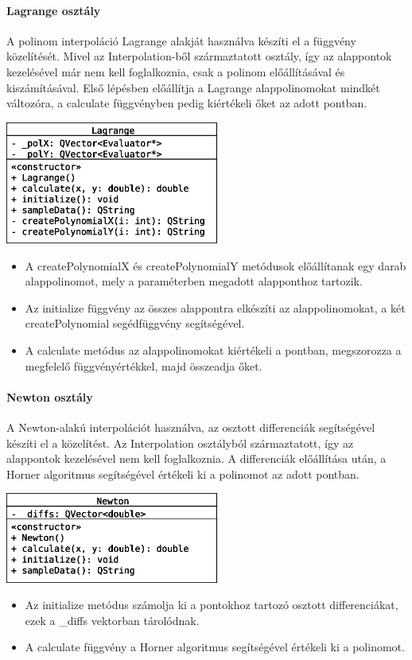\documentclass[12pt]{report}
\begin{document}
\paragraph{Lagrange osztály}
A polinom interpoláció Lagrange alakját használva készíti el a függvény közelítését. Mivel az Interpolation-ből származtatott osztály, így az alappontok kezelésével már nem kell foglalkoznia, csak a polinom előállításával és kiszámításával. Első lépésben előállítja a Lagrange alappolinomokat mindkét változóra, a calculate függvényben pedig kiértékeli őket az adott pontban.
\begin{center}
\includegraphics[width=7cm]{pics/uml/Lagrange}
\end{center}
\begin{itemize}
\item A createPolynomialX és createPolynomialY metódusok előállítanak egy darab alappolinomot, mely a paraméterben megadott alapponthoz tartozik.
\item Az initialize függvény az összes alappontra elkészíti az alappolinomokat, a két createPolynomial segédfüggvény segítségével.
\item A calculate metódus az alappolinomokat kiértékeli a pontban, megszorozza a megfelelő függvényértékkel, majd összeadja őket.
\end{itemize}

\paragraph{Newton osztály}
A Newton-alakú interpolációt használva, az osztott differenciák segítségével készíti el a közelítést. Az Interpolation osztályból származtatott, így az alappontok kezelésével nem kell foglalkoznia. A differenciák előállítása után, a Horner algoritmus segítségével értékeli ki a polinomot az adott pontban.
\begin{center}
\includegraphics[width=7cm]{pics/uml/Newton}
\end{center}
\begin{itemize}
\item Az initialize metódus számolja ki a pontokhoz tartozó osztott differenciákat, ezek a \_diffs vektorban tárolódnak.
\item A calculate függvény a Horner algoritmus segítségével értékeli ki a polinomot.
\end{itemize}
\end{document}
